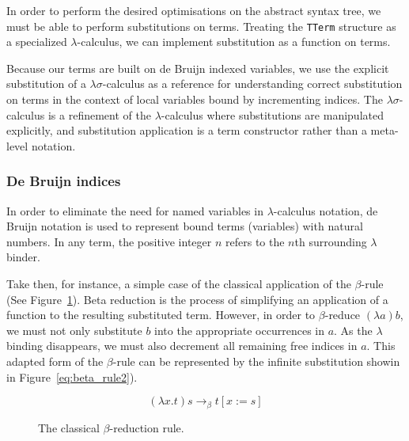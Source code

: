 In order to perform the desired optimisations on the abstract syntax tree, we must be able to perform substitutions on terms. Treating the \lstinline{TTerm} structure as a specialized $\lambda$-calculus, we can implement substitution as a function on terms.

Because our terms are built on de Bruijn indexed variables, we use the explicit substitution of a $\lambda\sigma$-calculus as a reference for understanding correct substitution on terms in the context of local variables bound by incrementing indices. The $\lambda\sigma$-calculus is a refinement of the $\lambda$-calculus where substitutions are manipulated explicitly, and substitution application is a term constructor rather than a meta-level notation.\cite{abadi1991}

\subsubsection{De Bruijn indices}

In order to eliminate the need for named variables in $\lambda$-calculus notation, de Bruijn notation is used to represent bound terms (variables) with natural numbers. In any term, the positive integer $n$ refers to the $n$th surrounding $\lambda$ binder.\cite{debruijn1972}


Take then, for instance, a simple case of the classical application of the $\beta$-rule (See Figure~\ref{eq:beta_rule}). Beta reduction is the process of simplifying an application of a function to the resulting substituted term. However, in order to $\beta$-reduce $(\lambda a)b$, we must not only substitute $b$ into the appropriate occurrences in $a$. As the $\lambda$ binding disappears, we must also decrement all remaining free indices in $a$. This adapted form of the $\beta$-rule can be represented by the infinite substitution showin in Figure~\ref{eq:beta_rule2}).\cite{abadi1991}


\begin{figure}
\begin{equation*}
(\lambda x.t)s \to_{\beta} t[x := s]
\end{equation*}
\caption{The classical $\beta$-reduction rule.}
\label{eq:beta_rule}
\end{figure}

